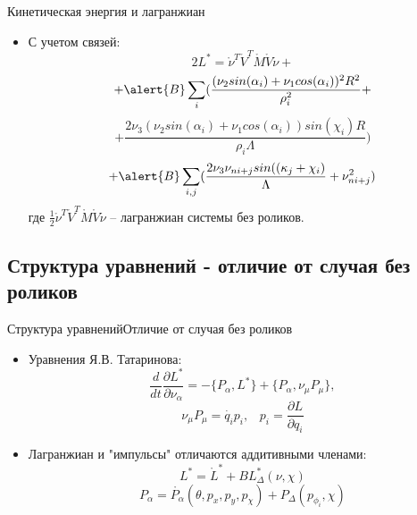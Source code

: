 \documentclass{beamer}
\begin{document}
\begin{frame}{Кинетическая энергия и лагранжиан}
  \begin{itemize}
  \item {
    С учетом связей:
    $$ 2L^{*} = \mathring{\nu}^T \mathring{V}^T \mathring{M} \mathring{V} \mathring{\nu} + $$
    $$ + \alert{B}\sum_{i}(
    	\frac{(\nu_2sin(\alpha_i)+\nu_1cos(\alpha_i))^2R^2}
    	{\rho_i^2} + $$
    $$ +
    	\frac{2\nu_3(\nu_2sin(\alpha_i)+\nu_1cos(\alpha_i))sin(\chi_i)R}
    	{\rho_i\Lambda}
    ) $$
    $$ +
    \alert{B}\sum_{i,j}(
    	\frac{2\nu_3\nu_{ni+j}sin((\kappa_j+\chi_i)}
    	{\Lambda}
    	+
    	\nu_{ni+j}^2
    )
    $$
    где $ \frac{1}{2}\mathring{\nu}^T \mathring{V}^T \mathring{M} \mathring{V} \mathring{\nu} $ -- лагранжиан системы без роликов.
  }

  \end{itemize}
\end{frame}


\subsection{Структура уравнений - отличие от случая без роликов}

\begin{frame}{Структура уравнений}{Отличие от случая без роликов}
  \begin{itemize}
  \item {
    Уравнения Я.В. Татаринова:
    $$ \frac{d}{dt}\frac{\partial L^{*}}{\partial \nu_\alpha} = - \{P_\alpha, L^{*}\} + \{P_\alpha, \nu_\mu P_\mu\}, $$
    $$ \nu_\mu P_\mu = \dot{q_i} p_i, \hspace{10pt} p_i = \frac{\partial L}{\partial q_i} $$
  }
  \item {
    Лагранжиан и "импульсы" отличаются аддитивными членами:
    $$ L^{*} = \mathring{L}^{*} + BL^{*}_\Delta(\nu, \chi) $$
    $$ P_\alpha = \mathring{P_\alpha}(\theta, p_x, p_y, p_\chi) + P_\Delta(p_{\phi_i}, \chi) $$
  }

  \end{itemize}
\end{frame}
\end{document}
